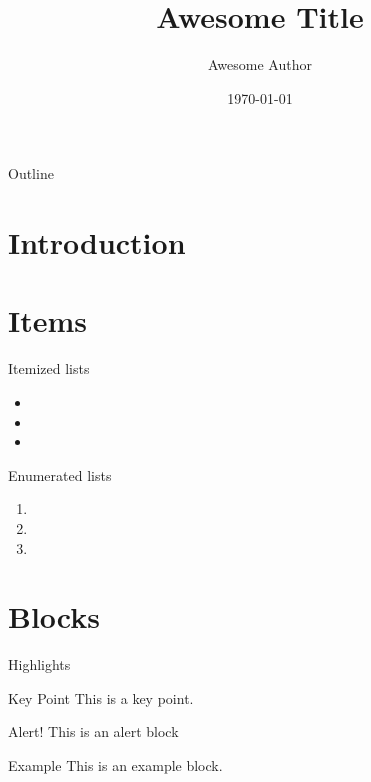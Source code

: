 \documentclass[aspectratio=1609]{beamer}
\title{Awesome Title}
\author{Awesome Author}
\date{\today}
\begin{document}
\titlepage

\begin{frame}{Outline}
  \tableofcontents
\end{frame}

\section{Introduction}

\begin{frame}
  \lipsum[1][1-8]
\end{frame}

\begin{frame}
  \lipsum[2][1-8]
\end{frame}

\section{Items}
\begin{frame}{Itemized lists}
  \begin{itemize}
    \item \lipsum[2][1]
    \item \lipsum[4][1]
    \item \lipsum[6][1]
  \end{itemize}
\end{frame}

\begin{frame}{Enumerated lists}
  \begin{enumerate}
    \item \lipsum[3][2]
    \item \lipsum[5][2]
    \item \lipsum[7][2]
 \end{enumerate}
\end{frame}

\section{Blocks}
\begin{frame}{Highlights}
  \begin{block}{Key Point}
    This is a key point.
  \end{block}
  \begin{alertblock}{Alert!}
    This is an alert block
  \end{alertblock}
  \begin{exampleblock}{Example}
    This is an example block.
  \end{exampleblock}
\end{frame}

\closingpage
\end{document}

